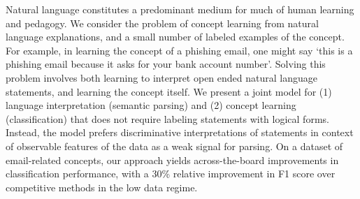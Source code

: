 Natural language constitutes a predominant medium for much of human learning and pedagogy. We consider the problem of concept learning from natural language explanations, and a small number of labeled examples of the concept. For example, in learning the concept of a phishing email, one might say `this is a phishing email because it asks for your bank account number'. Solving this problem involves both learning to interpret open ended natural language statements, and learning the concept itself. We present a joint model for (1) language interpretation (semantic parsing) and (2) concept learning (classification) that does not require labeling statements with logical forms. Instead, the model prefers discriminative interpretations of statements in context of observable features of the data as a weak signal for parsing. On a dataset of email-related concepts, our approach yields across-the-board improvements in classification performance, with a 30\% relative improvement in F1 score over competitive methods in the low data regime.

